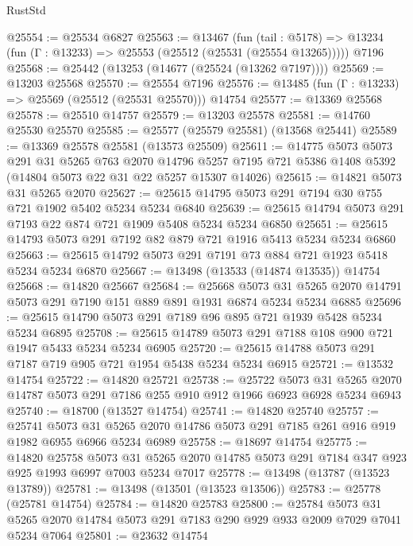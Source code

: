 \begin{lexlean}{RustStd}
\begin{coremodule}
@25554 := @25534 @6827
@25563 := @13467
    (fun (tail : @5178) => @13234 (fun (Γ : @13233) => @25553 (@25512 (@25531 (@25554 @13265)))))
    @7196
@25568 := @25442 (@13253 (@14677 (@25524 (@13262 @7197))))
@25569 := @13203 @25568
@25570 := @25554 @7196
@25576 := @13485 (fun (Γ : @13233) => @25569 (@25512 (@25531 @25570))) @14754
@25577 := @13369 @25568
@25578 := @25510 @14757
@25579 := @13203 @25578
@25581 := @14760 @25530 @25570
@25585 := @25577 (@25579 @25581) (@13568 @25441)
@25589 := @13369 @25578 @25581 (@13573 @25509)
@25611 := @14775
    @5073
    @5073
    @291
    @31
    @5265
    @763
    @2070
    @14796
    @5257
    @7195
    @721
    @5386
    @1408
    @5392
    (@14804 @5073 @22 @31 @22 @5257 @15307 @14026)
@25615 := @14821 @5073 @31 @5265 @2070
@25627 := @25615 @14795 @5073 @291 @7194 @30 @755 @721 @1902 @5402 @5234 @5234 @6840
@25639 := @25615 @14794 @5073 @291 @7193 @22 @874 @721 @1909 @5408 @5234 @5234 @6850
@25651 := @25615 @14793 @5073 @291 @7192 @82 @879 @721 @1916 @5413 @5234 @5234 @6860
@25663 := @25615 @14792 @5073 @291 @7191 @73 @884 @721 @1923 @5418 @5234 @5234 @6870
@25667 := @13498 (@13533 (@14874 @13535)) @14754
@25668 := @14820 @25667
@25684 := @25668
    @5073
    @31
    @5265
    @2070
    @14791
    @5073
    @291
    @7190
    @151
    @889
    @891
    @1931
    @6874
    @5234
    @5234
    @6885
@25696 := @25615 @14790 @5073 @291 @7189 @96 @895 @721 @1939 @5428 @5234 @5234 @6895
@25708 := @25615 @14789 @5073 @291 @7188 @108 @900 @721 @1947 @5433 @5234 @5234 @6905
@25720 := @25615 @14788 @5073 @291 @7187 @719 @905 @721 @1954 @5438 @5234 @5234 @6915
@25721 := @13532 @14754
@25722 := @14820 @25721
@25738 := @25722
    @5073
    @31
    @5265
    @2070
    @14787
    @5073
    @291
    @7186
    @255
    @910
    @912
    @1966
    @6923
    @6928
    @5234
    @6943
@25740 := @18700 (@13527 @14754)
@25741 := @14820 @25740
@25757 := @25741
    @5073
    @31
    @5265
    @2070
    @14786
    @5073
    @291
    @7185
    @261
    @916
    @919
    @1982
    @6955
    @6966
    @5234
    @6989
@25758 := @18697 @14754
@25775 := @14820
    @25758
    @5073
    @31
    @5265
    @2070
    @14785
    @5073
    @291
    @7184
    @347
    @923
    @925
    @1993
    @6997
    @7003
    @5234
    @7017
@25778 := @13498 (@13787 (@13523 @13789))
@25781 := @13498 (@13501 (@13523 @13506))
@25783 := @25778 (@25781 @14754)
@25784 := @14820 @25783
@25800 := @25784
    @5073
    @31
    @5265
    @2070
    @14784
    @5073
    @291
    @7183
    @290
    @929
    @933
    @2009
    @7029
    @7041
    @5234
    @7064
@25801 := @23632 @14754

\end{coremodule}
\end{lexlean}
